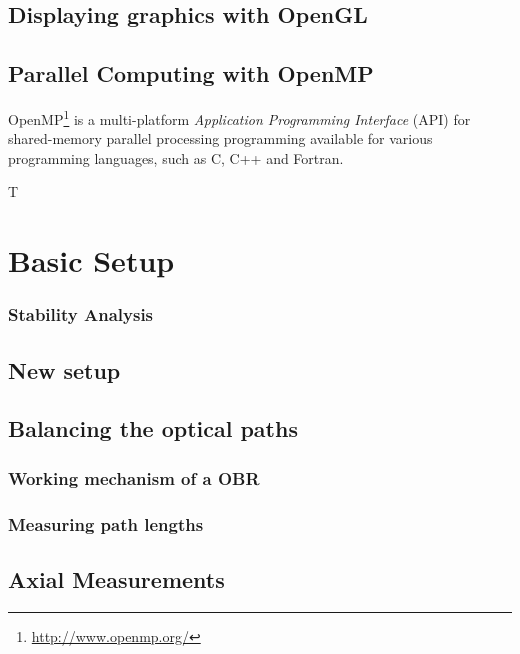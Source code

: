 \subsection{Displaying graphics with OpenGL}

\subsection{Parallel Computing with OpenMP}
OpenMP\footnote{\url{http://www.openmp.org/}}  is a multi-platform \emph{Application Programming Interface} (API) for shared-memory parallel processing programming available for various programming languages, such as C, C++ and Fortran. 

T



\section{Basic Setup}






\subsubsection{Stability Analysis}


\subsection{New setup}

\subsection{Balancing the optical paths}

\subsubsection{Working mechanism of a OBR}

\subsubsection{Measuring path lengths}




\subsection{Axial Measurements}



